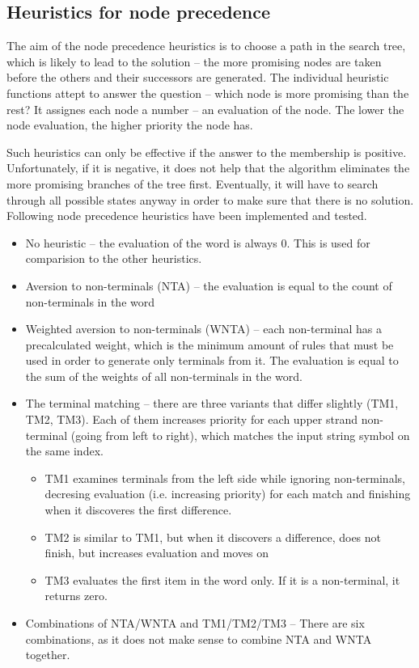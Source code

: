 \begin{enumerate}
\section{Heuristics for node precedence} \label{heur_node_pref}

The aim of the node precedence heuristics is to choose a path in the search tree, which is likely to lead to the solution -- the more promising nodes are taken before the others and their successors are generated. The individual heuristic functions attept to answer the question -- which node is more promising than the rest? It assignes each node a number -- an evaluation of the node. The lower the node evaluation, the higher priority the node has.

Such heuristics can only be effective if the answer to the membership is positive. Unfortunately, if it is negative, it does not help that the algorithm eliminates the more promising branches of the tree first. Eventually, it will have to search through all possible states anyway in order to make sure that there is no solution.
Following node precedence heuristics have been implemented and tested.

\begin{itemize}
  \item{No heuristic -- the evaluation of the word is always 0. This is used for comparision to the other heuristics.}
  \item{Aversion to non-terminals (NTA) -- the evaluation is equal to the count of non-terminals in the word}
  \item{Weighted aversion to non-terminals (WNTA) -- each non-terminal has a precalculated weight, which is the minimum amount of rules that must be used in order to generate only terminals from it. The evaluation is equal to the sum of the weights of all non-terminals in the word.}
  \item{The terminal matching -- there are three variants that differ slightly (TM1, TM2, TM3). Each of them increases priority for each upper strand non-terminal (going from left to right), which matches the input string symbol on the same index.
  \begin{itemize}
    \item{TM1 examines terminals from the left side while ignoring non-terminals, decresing evaluation (i.e. increasing priority) for each match and finishing when it discoveres the first difference.}
    \item{TM2 is similar to TM1, but when it discovers a difference, does not finish, but increases evaluation and moves on}
    \item{TM3 evaluates the first item in the word only. If it is a non-terminal, it returns zero.}
  \end{itemize}
  }
  \item{Combinations of NTA/WNTA and TM1/TM2/TM3 -- There are six combinations, as it does not make sense to combine NTA and WNTA together.}
\end{itemize}


\end{enumerate}
